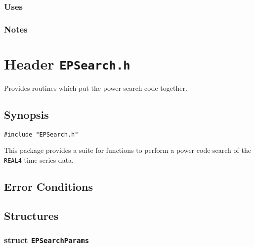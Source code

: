 \subsubsection*{Uses}

\subsubsection*{Notes}

\vfill{\footnotesize}


%
%
%
%
%
%


\newpage
\section{Header \texttt{EPSearch.h}}
\label{s:EPSearch.h}

\noindent Provides routines which put the power search code together.

\subsection*{Synopsis}
\begin{verbatim}
#include "EPSearch.h"
\end{verbatim}

\noindent This package provides a suite for functions to perform a
power code search of the \texttt{REAL4} time series data.

\subsection*{Error Conditions}


\subsection*{Structures}

\subsubsection*{struct \texttt{EPSearchParams}}

